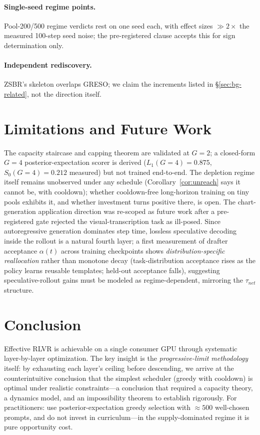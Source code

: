\documentclass[11pt]{article}
\theoremstyle{definition}
\begin{document}
\paragraph{Single-seed regime points.} Pool-200/500 regime verdicts rest on one
seed each, with effect sizes $\gg2\times$ the measured 100-step seed noise; the
pre-registered clause accepts this for sign determination only.
\paragraph{Independent rediscovery.} ZSBR's skeleton overlaps GRESO; we claim the
increments listed in \S\ref{sec:bg-related}, not the direction itself.

\section{Limitations and Future Work}\label{sec:limits}
The capacity staircase and capping theorem are validated at $G{=}2$; a closed-form
$G{=}4$ posterior-expectation scorer is derived ($L_1(G{=}4){=}0.875$,
$S_0(G{=}4){=}0.212$ measured) but not trained end-to-end. The depletion regime
itself remains unobserved under any schedule (Corollary~\ref{cor:unreach} says it
cannot be, with cooldown); whether cooldown-free long-horizon training on tiny
pools exhibits it, and whether investment turns positive there, is open. The
chart-generation application direction was re-scoped as future work after a
pre-registered gate rejected the visual-transcription task as ill-posed. Since
autoregressive generation dominates step time, lossless speculative decoding
inside the rollout is a natural fourth layer; a first measurement of drafter
acceptance $\alpha(t)$ across training checkpoints shows
\emph{distribution-specific reallocation} rather than monotone decay
(task-distribution acceptance rises as the policy learns reusable templates;
held-out acceptance falls), suggesting speculative-rollout gains must be modeled as
regime-dependent, mirroring the $\tau_{net}$ structure.

\section{Conclusion}\label{sec:concl}
Effective RLVR is achievable on a single consumer GPU through systematic
layer-by-layer optimization. The key insight is the \emph{progressive-limit
methodology} itself: by exhausting each layer's ceiling before descending, we
arrive at the counterintuitive conclusion that the simplest scheduler (greedy with
cooldown) is optimal under realistic constraints---a conclusion that required a
capacity theory, a dynamics model, and an impossibility theorem to establish
rigorously. For practitioners: use posterior-expectation greedy selection with
${\approx}500$ well-chosen prompts, and do not invest in curriculum---in the
supply-dominated regime it is pure opportunity cost.
\end{document}

